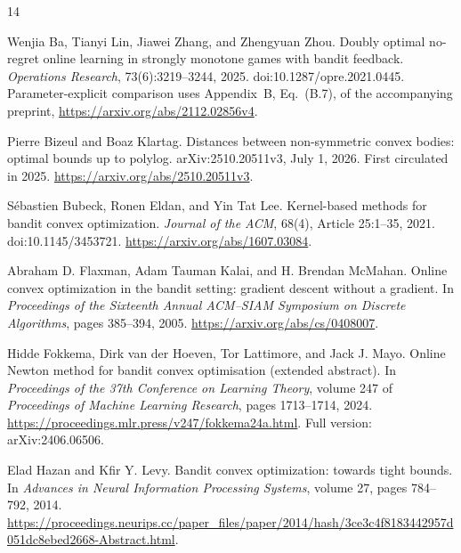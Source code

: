 \documentclass[11pt]{article}
\numberwithin{equation}{section}
\theoremstyle{definition}
\theoremstyle{remark}
\begin{document}
\clearpage
\begin{thebibliography}{14}
\small
\setlength{\itemsep}{5pt}
\raggedright

Wenjia Ba, Tianyi Lin, Jiawei Zhang, and Zhengyuan Zhou.
\newblock Doubly optimal no-regret online learning in strongly monotone games
with bandit feedback.
\newblock \emph{Operations Research}, 73(6):3219--3244, 2025.
\newblock doi:10.1287/opre.2021.0445.
\newblock Parameter-explicit comparison uses Appendix~B, Eq.~(B.7), of the
accompanying preprint, \url{https://arxiv.org/abs/2112.02856v4}.

Pierre Bizeul and Boaz Klartag.
\newblock Distances between non-symmetric convex bodies: optimal bounds up to
polylog.
\newblock arXiv:2510.20511v3, July 1, 2026. First circulated in 2025.
\newblock \url{https://arxiv.org/abs/2510.20511v3}.

S\'ebastien Bubeck, Ronen Eldan, and Yin Tat Lee.
\newblock Kernel-based methods for bandit convex optimization.
\newblock \emph{Journal of the ACM}, 68(4), Article 25:1--35, 2021.
\newblock doi:10.1145/3453721.
\newblock \url{https://arxiv.org/abs/1607.03084}.

Abraham D. Flaxman, Adam Tauman Kalai, and H. Brendan McMahan.
\newblock Online convex optimization in the bandit setting: gradient descent
without a gradient.
\newblock In \emph{Proceedings of the Sixteenth Annual ACM--SIAM Symposium on
Discrete Algorithms}, pages 385--394, 2005.
\newblock \url{https://arxiv.org/abs/cs/0408007}.

Hidde Fokkema, Dirk van der Hoeven, Tor Lattimore, and Jack J. Mayo.
\newblock Online Newton method for bandit convex optimisation (extended abstract).
\newblock In \emph{Proceedings of the 37th Conference on Learning Theory},
volume 247 of \emph{Proceedings of Machine Learning Research}, pages 1713--1714,
2024.
\newblock \url{https://proceedings.mlr.press/v247/fokkema24a.html}.
\newblock Full version: arXiv:2406.06506.

Elad Hazan and Kfir Y. Levy.
\newblock Bandit convex optimization: towards tight bounds.
\newblock In \emph{Advances in Neural Information Processing Systems},
volume 27, pages 784--792, 2014.
\newblock \url{https://proceedings.neurips.cc/paper_files/paper/2014/hash/3ce3c4f8183442957d051dc8ebed2668-Abstract.html}.


\end{thebibliography}
\end{document}
